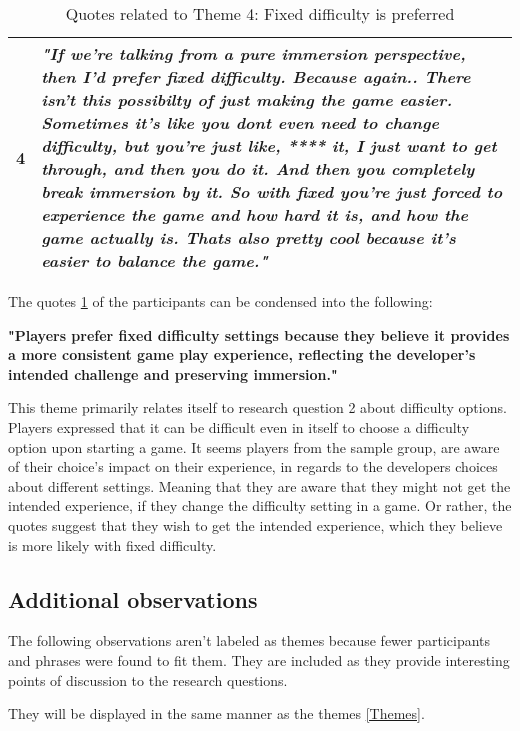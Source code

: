 \begin{table}[H]
\begin{tabular}{@{}c p{11cm}@{}}
\midrule

4 & \textit{"If we're talking from a pure immersion perspective, then I'd prefer fixed difficulty. Because again.. There isn't this possibilty of just making the game easier. Sometimes it's like you dont even need to change difficulty, but you're just like, **** it, I just want to get through, and then you do it. And then you completely break immersion by it. So with fixed you're just forced to experience the game and how hard it is, and how the game actually is. Thats also pretty cool because it's easier to balance the game."}\\

\bottomrule
\end{tabular}

\caption{Quotes related to Theme 4: Fixed difficulty is preferred}
\label{tab:theme4-quotes}
\end{table}

The quotes \ref{tab:theme4-quotes} of the participants can be condensed into the following:
\begin{center}
    \textbf{"Players prefer fixed difficulty settings because they believe it provides a more consistent game play experience, reflecting the developer's intended challenge and preserving immersion."}
\end{center}

This theme primarily relates itself to research question 2 about difficulty options. Players expressed that it can be difficult even in itself to choose a difficulty option upon starting a game. It seems players from the sample group, are aware of their choice's impact on their experience, in regards to the developers choices about different settings. Meaning that they are aware that they might not get the intended experience, if they change the difficulty setting in a game. Or rather, the quotes suggest that they wish to get the intended experience, which they believe is more likely with fixed difficulty. 

\subsection{Additional observations}
The following observations aren't labeled as themes because fewer participants and phrases were found to fit them. They are included as they provide interesting points of discussion to the research questions.

They will be displayed in the same manner as the themes \ref{Themes}.

